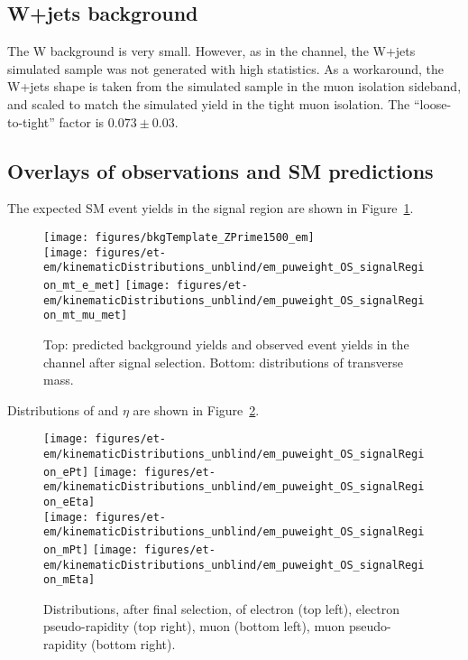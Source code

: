 \subsection{W+jets background}
\label{sec:em_w_bkg_validation}
The W background is very small.  However, as in the \teth channel, the
W+jets simulated sample was not generated with high statistics.  As a
workaround, the W+jets shape is taken from the simulated sample in the
muon isolation sideband, and scaled to match the simulated yield in
the tight muon isolation.  The ``loose-to-tight'' factor is
$0.073\pm0.03$.

\subsection{Overlays of observations and SM predictions}
\label{sec:em_overlays}

The expected SM event yields in the signal region are shown in
Figure~\ref{fig:em_sm_template_and_mt}.
\begin{figure}\centering
  \texttt{[image: figures/bkgTemplate\_ZPrime1500\_em]} \\
  \texttt{[image: figures/et-em/kinematicDistributions\_unblind/em\_puweight\_OS\_signalRegion\_mt\_e\_met]}
  \texttt{[image: figures/et-em/kinematicDistributions\_unblind/em\_puweight\_OS\_signalRegion\_mt\_mu\_met]}
  \caption{\label{fig:em_sm_template_and_mt} Top: predicted background
    yields and observed event yields in the \tetm channel after signal
    selection.  Bottom: distributions of transverse mass.}
\end{figure}

Distributions of \pt and $\eta$ are shown in Figure~\ref{fig:em_sr_pt_eta}.
\begin{figure}\centering
  \texttt{[image: figures/et-em/kinematicDistributions\_unblind/em\_puweight\_OS\_signalRegion\_ePt]}
  \texttt{[image: figures/et-em/kinematicDistributions\_unblind/em\_puweight\_OS\_signalRegion\_eEta]} \\
  \texttt{[image: figures/et-em/kinematicDistributions\_unblind/em\_puweight\_OS\_signalRegion\_mPt]}
  \texttt{[image: figures/et-em/kinematicDistributions\_unblind/em\_puweight\_OS\_signalRegion\_mEta]}
  \caption{\label{fig:em_sr_pt_eta} Distributions, after \tetm final
    selection, of electron \pt (top left), electron pseudo-rapidity
    (top right), muon \pt (bottom left), muon pseudo-rapidity (bottom
    right).}
\end{figure}
